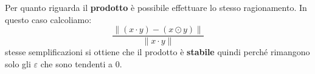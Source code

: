 Per quanto riguarda il \textbf{prodotto} è possibile effettuare lo stesso
ragionamento. In questo caso calcoliamo:
\begin{equation}
    \frac{\|(x\cdot y)-(x\odot y)\|}{\|x\cdot y\|}
\end{equation}
stesse semplificazioni si ottiene che il prodotto è \textbf{stabile} quindi perché
rimangono solo gli $\varepsilon$ che sono tendenti a $0$.